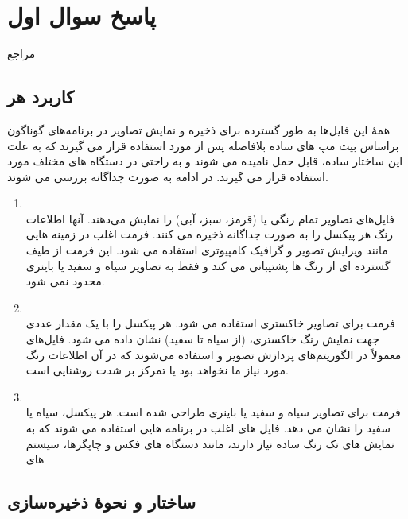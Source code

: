 \documentclass{article}
\begin{document}
	
	
	\tableofcontents
	\newpage
	
	\section{پاسخ سوال اول}
مراجع \cite{1} \cite{2} \cite{3}
	\subsection{کاربرد هر }
همۀ این فایل‌ها به طور گسترده برای ذخیره و نمایش تصاویر در برنامه‌های گوناگون براساس بیت مپ های ساده بلافاصله پس از  مورد استفاده قرار می گیرند که به علت این ساختار ساده، قابل حمل نامیده می شوند و به راحتی در دستگاه های مختلف مورد استفاده قرار می گیرند. در ادامه به صورت جداگانه بررسی می شوند.

\begin{enumerate}
\item {}\\
فایل‌های  تصاویر تمام رنگی یا  (قرمز، سبز، آبی) را نمایش می‌دهند. آنها اطلاعات رنگ هر پیکسل را به صورت جداگانه ذخیره می کنند. فرمت  اغلب در زمینه هایی مانند ویرایش تصویر و گرافیک کامپیوتری استفاده می شود. این فرمت از طیف گسترده ای از رنگ ها پشتیبانی می کند و فقط به تصاویر سیاه و سفید یا باینری محدود نمی شود.


\item {}\\
فرمت  برای تصاویر خاکستری استفاده می شود. هر پیکسل را با یک مقدار عددی جهت نمایش رنگ خاکستری، (از سیاه تا سفید) نشان داده می شود. فایل‌های  معمولاً در الگوریتم‌های پردازش تصویر و  استفاده می‌شوند که در آن اطلاعات رنگ مورد نیاز ما نخواهد بود یا تمرکز بر شدت روشنایی است.

\item {}\\
فرمت  برای تصاویر سیاه و سفید یا باینری طراحی شده است. هر پیکسل، سیاه یا سفید را نشان می دهد. فایل های  اغلب در برنامه هایی استفاده می شوند که به نمایش های تک رنگ ساده نیاز دارند، مانند دستگاه های فکس و چاپگرها، سیستم های 

\end{enumerate}

	\subsection{ساختار  و نحوۀ ذخیره‌سازی}
\end{document}
